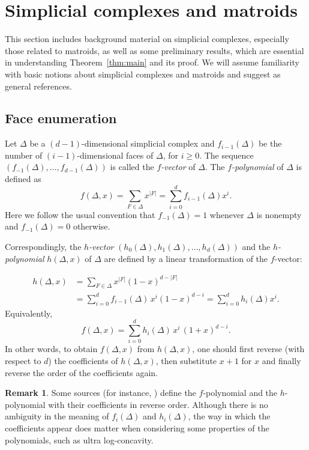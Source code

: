 \documentclass[11pt]{amsart}
\theoremstyle{theorems}
\theoremstyle{definition}
\newtheorem{remark}[theorem]{Remark}
\begin{document}
\section{Simplicial complexes and matroids}
\label{sec:complexes}

This section includes background material on simplicial complexes, 
especially those related to matroids, as well as some preliminary 
results, which are essential in understanding Theorem~\ref{thm:main}
and its proof. We will assume familiarity with basic notions about 
simplicial complexes and matroids and suggest \cite{Bj92, Oxl11, 
Sta96} as general references.

\subsection{Face enumeration}
Let $\Delta$ be a $(d-1)$-dimensional simplicial complex and 
$f_{i-1}(\Delta)$ be the number of $(i-1)$-dimensional faces of 
$\Delta$, for $i \ge 0$. The sequence 
$(f_{-1}(\Delta),\ldots,f_{d-1}(\Delta))$ is called the 
\emph{$f$-vector} of $\Delta$. The \emph{$f$-polynomial} of 
$\Delta$ is defined as
%
\[ f(\Delta,x) = \sum_{F\in \Delta} x^{|F|} 
               = \sum_{i=0}^{d} f_{i-1} (\Delta) x^i. \]
Here we follow the usual convention that $f_{-1}(\Delta) = 1$ 
whenever $\Delta$ is nonempty and $f_{-1}(\Delta) = 0$ otherwise.

Correspondingly, the \emph{$h$-vector} $(h_0(\Delta), 
h_1(\Delta),\dots,h_d(\Delta))$ and the \emph{$h$-polynomial} 
$h(\Delta, x)$ of $\Delta$ are defined by a linear transformation 
of the $f$-vector:

\begin{align} \label{eq:hdef}
    h(\Delta, x) & = \sum_{F \in \Delta} x^{|F|} (1-x)^{d-|F|} 
		\\ \nonumber & = \sum_{i=0}^d f_{i-1} (\Delta) \, x^i (1-x)^{d-i} = 
		\sum_{i=0}^d h_i(\Delta) x^i.
\end{align}
%
Equivalently,
%
\begin{equation}\label{eq:f-from-h}
    f(\Delta,x) = \sum_{i=0}^d h_i(\Delta)\, x^i\, (1+x)^{d-i}.
\end{equation}
%
In other words, to obtain $f(\Delta,x)$ from $h(\Delta,x)$, 
one should first reverse (with respect to $d$) the coefficients of 
$h(\Delta,x)$, then substitute $x+1$ for $x$ and finally reverse 
the order of the coefficients again.

\begin{remark}
Some sources (for instance, \cite{ADH23, Bj92}) define the 
$f$-polynomial and the $h$-polynomial with their coefficients in 
reverse order. Although there is no ambiguity in the meaning of 
$f_i(\Delta)$ and $h_i(\Delta)$, the way in which the coefficients 
appear does matter when considering some properties of the 
polynomials, such as ultra log-concavity.
\end{remark}
\end{document}
